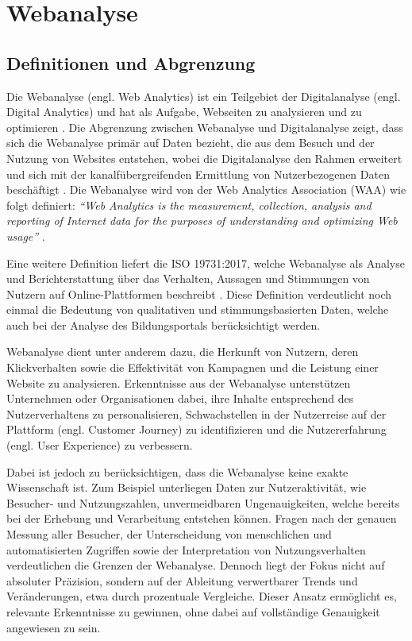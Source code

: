 \chapter{Webanalyse} %
\label{ch:webanalyse} 

\section{Definitionen und Abgrenzung} %
\label{sec:definitionabgrenzung}
Die Webanalyse (engl. Web Analytics) ist ein Teilgebiet der Digitalanalyse (engl. Digital Analytics) und hat als Aufgabe, Webseiten zu analysieren und zu optimieren \parencite[Kap.1.2]{Hassler2019}. Die Abgrenzung zwischen Webanalyse und Digitalanalyse zeigt, dass sich die Webanalyse primär auf Daten bezieht, die aus dem Besuch und der Nutzung von Websites entstehen, wobei die Digitalanalyse den Rahmen erweitert und sich mit der kanalfübergreifenden Ermittlung von Nutzerbezogenen Daten beschäftigt \parencite[Kap.1.2]{Hassler2019}. Die Webanalyse wird von der Web Analytics Association (WAA) wie folgt definiert: \textit{``Web Analytics is the measurement, collection, analysis and reporting of Internet data for the purposes of understanding and optimizing Web usage''} \parencite[3]{WAA2008}.

Eine weitere Definition liefert die ISO 19731:2017, welche Webanalyse als Analyse und Berichterstattung über das Verhalten, Aussagen und Stimmungen von Nutzern auf Online-Plattformen beschreibt \parencite[Kap.3.40]{ISO2017}. Diese Definition verdeutlicht noch einmal die Bedeutung von qualitativen und stimmungsbasierten Daten, welche auch bei der Analyse des Bildungsportals berücksichtigt werden.

Webanalyse dient unter anderem dazu, die Herkunft von Nutzern, deren Klickverhalten sowie die Effektivität von Kampagnen und die Leistung einer Website zu analysieren. Erkenntnisse aus der Webanalyse unterstützen Unternehmen oder Organisationen dabei, ihre Inhalte entsprechend des Nutzerverhaltens zu personalisieren, Schwachstellen in der Nutzerreise auf der Plattform (engl. Customer Journey) zu identifizieren und die Nutzererfahrung (engl. User Experience) zu verbessern. \parencite{PiwikProWebanalyse}

Dabei ist jedoch zu berücksichtigen, dass die Webanalyse keine exakte Wissenschaft ist. Zum Beispiel unterliegen Daten zur Nutzeraktivität, wie Besucher- und Nutzungszahlen, unvermeidbaren Ungenauigkeiten, welche bereits bei der Erhebung und Verarbeitung entstehen können. Fragen nach der genauen Messung aller Besucher, der Unterscheidung von menschlichen und automatisierten Zugriffen sowie der Interpretation von Nutzungsverhalten verdeutlichen die Grenzen der Webanalyse. Dennoch liegt der Fokus nicht auf absoluter Präzision, sondern auf der Ableitung verwertbarer Trends und Veränderungen, etwa durch prozentuale Vergleiche. Dieser Ansatz ermöglicht es, relevante Erkenntnisse zu gewinnen, ohne dabei auf vollständige Genauigkeit angewiesen zu sein. \parencite[Kap.1.4]{Hassler2019}

